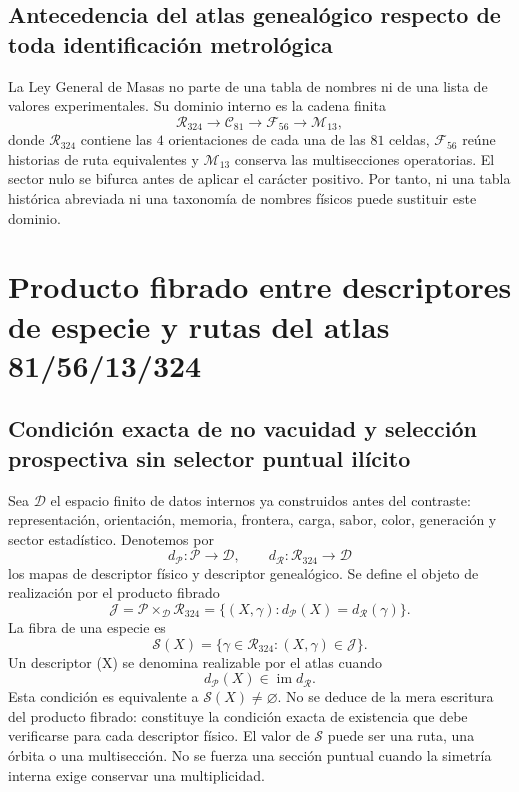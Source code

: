 \subsection{Antecedencia del atlas genealógico respecto de toda identificación metrológica}

La Ley General de Masas no parte de una tabla de nombres ni de una lista de
valores experimentales. Su dominio interno es la cadena finita
\[
 \mathcal R_{324}\longrightarrow \mathcal C_{81}
 \longrightarrow \mathcal F_{56}\longrightarrow \mathcal M_{13},
\]
donde \(\mathcal R_{324}\) contiene las \(4\) orientaciones de cada una de las
\(81\) celdas, \(\mathcal F_{56}\) reúne historias de ruta equivalentes y
\(\mathcal M_{13}\) conserva las multisecciones operatorias. El sector nulo
se bifurca antes de aplicar el carácter positivo. Por tanto, ni una tabla
histórica abreviada ni una taxonomía de nombres físicos puede sustituir este
dominio.

\section{Producto fibrado entre descriptores de especie y rutas del atlas 81/56/13/324}

\subsection{Condición exacta de no vacuidad y selección prospectiva sin selector puntual ilícito}

Sea \(\mathcal D\) el espacio finito de datos internos ya construidos antes del
contraste: representación, orientación, memoria, frontera, carga, sabor,
color, generación y sector estadístico. Denotemos por
\[
 d_{\mathcal P}:\mathcal P\longrightarrow\mathcal D,
 \qquad
 d_{\mathcal R}:\mathcal R_{324}\longrightarrow\mathcal D
\]
los mapas de descriptor físico y descriptor genealógico. Se define el objeto
de realización por el producto fibrado
\[
 \mathcal J
 =\mathcal P\times_{\mathcal D}\mathcal R_{324}
 =\{(X,\gamma):d_{\mathcal P}(X)=d_{\mathcal R}(\gamma)\}.
\]
La fibra de una especie es
\[
\mathscr S(X)=\{\gamma\in\mathcal R_{324}:(X,\gamma)\in\mathcal J\}.
\]
Un descriptor (X) se denomina realizable por el atlas cuando
\[
 d_{\mathcal P}(X)\in\operatorname{im}d_{\mathcal R}.
\]
Esta condición es equivalente a \(\mathscr S(X)\ne\varnothing\). No se deduce
de la mera escritura del producto fibrado: constituye la condición exacta de
existencia que debe verificarse para cada descriptor físico.
El valor de \(\mathscr S\) puede ser una ruta, una órbita o una multisección.
No se fuerza una sección puntual cuando la simetría interna exige conservar
una multiplicidad.

